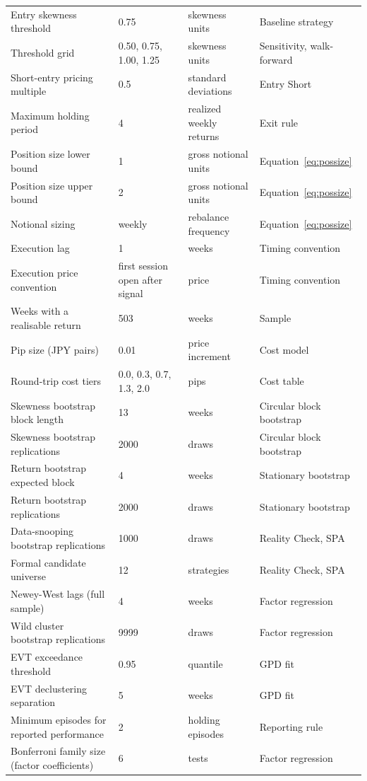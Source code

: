 \documentclass[11pt]{article}
\begin{document}
\begin{table}[H]
\begin{tabular}{@{}llll@{}}
Entry skewness threshold & 0.75 & skewness units & Baseline strategy \\
Threshold grid & 0.50, 0.75, 1.00, 1.25 & skewness units & Sensitivity, walk-forward \\
Short-entry pricing multiple & 0.5 & standard deviations & Entry Short \\
Maximum holding period & 4 & realized weekly returns & Exit rule \\
Position size lower bound & 1 & gross notional units & Equation~\ref{eq:possize} \\
Position size upper bound & 2 & gross notional units & Equation~\ref{eq:possize} \\
Notional sizing & weekly & rebalance frequency & Equation~\ref{eq:possize} \\
Execution lag & 1 & weeks & Timing convention \\
Execution price convention & first session open after signal & price & Timing convention \\
Weeks with a realisable return & 503 & weeks & Sample \\
Pip size (JPY pairs) & 0.01 & price increment & Cost model \\
Round-trip cost tiers & 0.0, 0.3, 0.7, 1.3, 2.0 & pips & Cost table \\
Skewness bootstrap block length & 13 & weeks & Circular block bootstrap \\
Skewness bootstrap replications & 2000 & draws & Circular block bootstrap \\
Return bootstrap expected block & 4 & weeks & Stationary bootstrap \\
Return bootstrap replications & 2000 & draws & Stationary bootstrap \\
Data-snooping bootstrap replications & 1000 & draws & Reality Check, SPA \\
Formal candidate universe & 12 & strategies & Reality Check, SPA \\
Newey-West lags (full sample) & 4 & weeks & Factor regression \\
Wild cluster bootstrap replications & 9999 & draws & Factor regression \\
EVT exceedance threshold & 0.95 & quantile & GPD fit \\
EVT declustering separation & 5 & weeks & GPD fit \\
Minimum episodes for reported performance & 2 & holding episodes & Reporting rule \\
Bonferroni family size (factor coefficients) & 6 & tests & Factor regression \\

\end{tabular}
\end{table}
\end{document}
